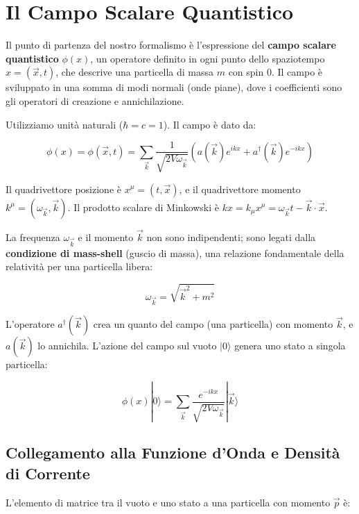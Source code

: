 \section{Il Campo Scalare Quantistico}

Il punto di partenza del nostro formalismo è l'espressione del \textbf{campo scalare quantistico} $\phi(x)$, un operatore definito in ogni punto dello spaziotempo $x = (\vec{x}, t)$, che descrive una particella di massa $m$ con spin 0. Il campo è sviluppato in una somma di modi normali (onde piane), dove i coefficienti sono gli operatori di creazione e annichilazione.

Utilizziamo unità naturali ($\hbar=c=1$). Il campo è dato da:

\begin{equation}
\phi(x) = \phi(\vec{x},t) = \sum_{\vec{k}} \frac{1}{\sqrt{2V\omega_{\vec{k}}}} \left( a(\vec{k})e^{ikx} + a^{\dagger}(\vec{k})e^{-ikx} \right)
\end{equation}

Il quadrivettore posizione è $x^\mu = (t, \vec{x})$, e il quadrivettore momento $k^\mu = (\omega_{\vec{k}}, \vec{k})$. Il prodotto scalare di Minkowski è $kx = k_\mu x^\mu = \omega_{\vec{k}} t - \vec{k} \cdot \vec{x}$.

La frequenza $\omega_{\vec{k}}$ e il momento $\vec{k}$ non sono indipendenti; sono legati dalla \textbf{condizione di mass-shell} (guscio di massa), una relazione fondamentale della relatività per una particella libera:

\begin{equation}
\omega_{\vec{k}} = \sqrt{\vec{k}^2 + m^2}
\end{equation}

L'operatore $a^{\dagger}(\vec{k})$ crea un quanto del campo (una particella) con momento $\vec{k}$, e $a(\vec{k})$ lo annichila. L'azione del campo sul vuoto $|0\rangle$ genera uno stato a singola particella:

\begin{equation}
\phi(x)|0\rangle = \sum_{\vec{k}} \frac{e^{-ikx}}{\sqrt{2V\omega_{\vec{k}}}} |\vec{k}\rangle
\end{equation}

\subsection{Collegamento alla Funzione d'Onda e Densità di Corrente}

L'elemento di matrice tra il vuoto e uno stato a una particella con momento $\vec{p}$ è:

